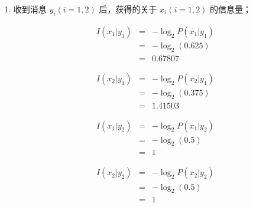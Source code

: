 \documentclass[onecolumn,oneside]{BUPTHomework}
\begin{document}
\begin{solution}
{\begin{enumerate}
      \begin{eqnarray} 
        P(x_1 \vert y_2) &=& \frac{P(x_1)P(y_2 \vert x_1)}{\sum_{j=1}^2P(x_j)P(y_2 \vert x_j)} \nonumber \\
        &=& \frac{0.6 \times \frac{1}{6}}{0.6 \times \frac{1}{6} + 0.4 \times \frac{1}{4}} \nonumber \\
        &=& 0.5 \nonumber
      \end{eqnarray}

      \begin{eqnarray} 
        P(x_2 \vert y_2) &=& \frac{P(x_2)P(y_2 \vert x_2)}{\sum_{j=1}^2P(x_j)P(y_2 \vert x_j)} \nonumber \\
        &=& \frac{0.4 \times \frac{1}{4}}{0.6 \times \frac{1}{6} + 0.4 \times \frac{1}{4}} \nonumber \\
        &=& 0.5 \nonumber
      \end{eqnarray}
      
      \item 收到消息 $y_i(i=1,2)$ 后，获得的关于 $x_i(i=1,2)$ 的信息量；
      
      \begin{eqnarray} 
        I(x_1 \vert y_1) &=& -\log_2P(x_1 \vert y_1) \nonumber \\
        &=& -\log_2(0.625) \nonumber \\
        &=& 0.67807 \nonumber
      \end{eqnarray}
      
      \begin{eqnarray} 
        I(x_2 \vert y_1) &=& -\log_2P(x_2 \vert y_1) \nonumber \\
        &=& -\log_2(0.375) \nonumber \\
        &=& 1.41503 \nonumber
      \end{eqnarray}

      \begin{eqnarray} 
        I(x_1 \vert y_2) &=& -\log_2P(x_1 \vert y_2) \nonumber \\
        &=& -\log_2(0.5) \nonumber \\
        &=& 1 \nonumber
      \end{eqnarray}

      \begin{eqnarray} 
        I(x_2 \vert y_2) &=& -\log_2P(x_2 \vert y_2) \nonumber \\
        &=& -\log_2(0.5) \nonumber \\
        &=& 1 \nonumber
      \end{eqnarray}


\end{enumerate}}
\end{solution}
\end{document}
